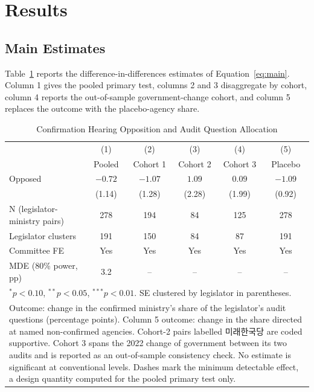 \documentclass[11pt]{article}
\begin{document}
\section{Results}

\subsection{Main Estimates}

Table~\ref{tab:main} reports the difference-in-differences estimates of Equation~\ref{eq:main}. Column 1 gives the pooled primary test, columns 2 and 3 disaggregate by cohort, column 4 reports the out-of-sample government-change cohort, and column 5 replaces the outcome with the placebo-agency share.

\begin{table}[!htbp]
\centering
\caption{Confirmation Hearing Opposition and Audit Question Allocation}
\label{tab:main}
\begin{tabular}{lccccc}
\toprule
& (1) & (2) & (3) & (4) & (5) \\
& Pooled & Cohort 1 & Cohort 2 & Cohort 3 & Placebo \\
\midrule
Opposed & $-0.72$ & $-1.07$ & $1.09$ & $0.09$ & $-1.09$ \\
& (1.14) & (1.28) & (2.28) & (1.99) & (0.92) \\
\midrule
N (legislator-ministry pairs) & 278 & 194 & 84 & 125 & 278 \\
Legislator clusters & 191 & 150 & 84 & 87 & 191 \\
Committee FE & Yes & Yes & Yes & Yes & Yes \\
MDE (80\% power, pp) & 3.2 & -- & -- & -- & -- \\
\bottomrule
\multicolumn{6}{l}{\footnotesize $^{*}p<0.10$, $^{**}p<0.05$, $^{***}p<0.01$. SE clustered by legislator in parentheses.} \\
\multicolumn{6}{l}{\footnotesize \parbox{0.92\textwidth}{Outcome: change in the confirmed ministry's share of the legislator's audit questions (percentage points). Column 5 outcome: change in the share directed at named non-confirmed agencies. Cohort-2 pairs labelled 미래한국당 are coded supportive. Cohort 3 spans the 2022 change of government between its two audits and is reported as an out-of-sample consistency check. No estimate is significant at conventional levels. Dashes mark the minimum detectable effect, a design quantity computed for the pooled primary test only.}} \\
\end{tabular}
\end{table}
\end{document}
